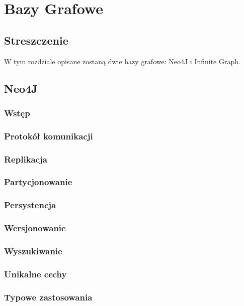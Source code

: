 \chapter{Bazy Grafowe}

\section*{Streszczenie}
W tym rozdziale opisane zostaną dwie bazy grafowe: Neo4J i Infinite Graph.

\section{Neo4J}
\label{sec:neo4j}

\subsection*{Wstęp} 

\subsection*{Protokół komunikacji}

\subsection*{Replikacja}

\subsection*{Partycjonowanie}

\subsection*{Persystencja}

\subsection*{Wersjonowanie}

\subsection*{Wyszukiwanie}

\subsection*{Unikalne cechy}

\subsection*{Typowe zastosowania}

